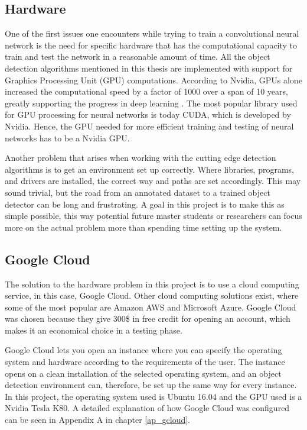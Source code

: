 \subsection{Hardware}
One of the first issues one encounters while trying to train a convolutional neural network is the need for specific hardware that has the computational capacity to train and test the network in a reasonable amount of time. All the object detection algorithms mentioned in this thesis are implemented with support for Graphics Processing Unit (GPU) computations. According to Nvidia, GPUs alone increased the computational speed by a factor of 1000 over a span of 10 years, greatly supporting the progress in deep learning \citep{Dettmers2015}. The most popular library used for GPU processing for neural networks is today CUDA, which is developed by Nvidia. Hence, the GPU needed for more efficient training and testing of neural networks has to be a Nvidia GPU. 

\vspace{3mm}

Another problem that arises when working with the cutting edge detection algorithms is to get an environment set up correctly. Where libraries, programs, and drivers are installed, the correct way and paths are set accordingly. This may sound trivial, but the road from an annotated dataset to a trained object detector can be long and frustrating. A goal in this project is to make this as simple possible, this way potential future master students or researchers can focus more on the actual problem more than spending time setting up the system. 

\subsection{Google Cloud}
The solution to the hardware problem in this project is to use a cloud computing service, in this case, Google Cloud. Other cloud computing solutions exist, where some of the most popular are Amazon AWS and Microsoft Azure. Google Cloud was chosen because they give 300\$ in free credit for opening an account, which makes it an economical choice in a testing phase.

\vspace{3mm}

Google Cloud lets you open an instance where you can specify the operating system and hardware according to the requirements of the user. The instance opens on a clean installation of the selected operating system, and an object detection environment can, therefore, be set up the same way for every instance. In this project, the operating system used is Ubuntu 16.04 and the GPU used is a Nvidia Tesla K80. A detailed explanation of how Google Cloud was configured can be seen in Appendix A in chapter \ref{ap_gcloud}.

